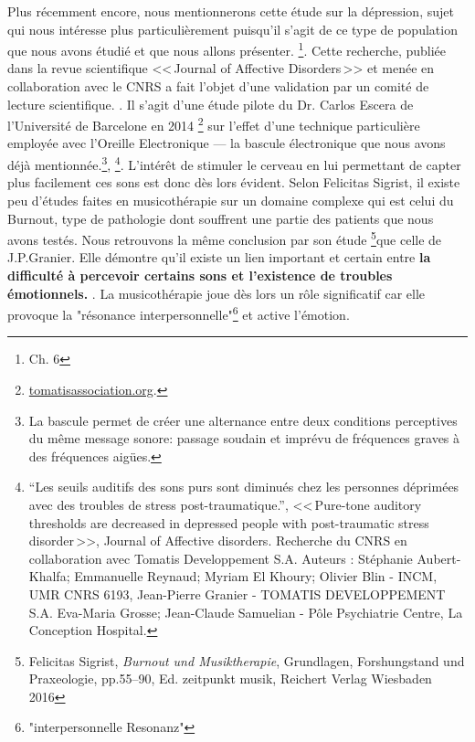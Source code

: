 Plus récemment encore, nous mentionnerons cette étude sur la dépression, sujet qui nous intéresse plus particulièrement puisqu'il s'agit de ce type de population que nous avons étudié et que nous allons présenter. \footnote{Ch. 6}. Cette recherche, publiée dans la revue scientifique <<\,Journal
of Affective Disorders\,>> et menée en collaboration avec le CNRS a fait l'objet d'une validation
par un comité de lecture scientifique. 
. Il s'agit d'une étude pilote du Dr. Carlos Escera
de l'Université de Barcelone en 2014%
\footnote{%
\href{http://tomatisassociation.org/scientific-validation-of-the-tomatis-effect-eeg-recordings-of-sound-from-brainstem-to-cerebral-cortex-encoding-university-of-barcelona-2014/}{tomatisassociation.org}.} sur l'effet d'une technique particulière employée avec l'Oreille Electronique
--- la bascule \label{bascule} électronique que  nous avons déjà mentionnée.\footnote{La bascule permet de créer une alternance entre deux conditions perceptives du même message sonore: passage soudain et imprévu de fréquences graves à des fréquences aigües.},%
\footnote{``Les seuils auditifs des sons purs 
		sont diminués chez les personnes déprimées avec des
		troubles de stress post-traumatique.'', <<\,Pure-tone auditory thresholds are decreased in depressed people with post-traumatic stress disorder\,>>, Journal of Affective disorders. Recherche du CNRS en collaboration
		avec Tomatis Developpement S.A. Auteurs : Stéphanie Aubert-Khalfa; Emmanuelle Reynaud; Myriam El Khoury;
		Olivier Blin - INCM, UMR CNRS 6193, Jean-Pierre Granier -
		TOMATIS DEVELOPPEMENT S.A. Eva-Maria Grosse; Jean-Claude Samuelian - Pôle Psychiatrie Centre, La Conception Hospital.}.
L'intérêt de stimuler
le cerveau en lui permettant de capter plus facilement ces sons est
donc dès lors évident.
Selon Felicitas Sigrist, il existe peu d'études faites en musicothérapie sur un domaine complexe qui est celui du Burnout, type de pathologie dont souffrent une partie des patients que nous avons testés. Nous retrouvons la même conclusion par son étude \footnote{Felicitas Sigrist,  \textit{Burnout und Musiktherapie}, Grundlagen, Forshungstand und Praxeologie, pp.55--90, Ed. zeitpunkt musik, Reichert Verlag Wiesbaden 2016}que celle de J.P.Granier. Elle démontre qu'il existe
un lien important et certain entre \textbf{la difficulté à percevoir
	certains sons et l'existence de troubles émotionnels. }. La musicothérapie joue dès lors un rôle significatif car elle provoque la "résonance interpersonnelle"\footnote{"interpersonnelle Resonanz"} et active l'émotion.





